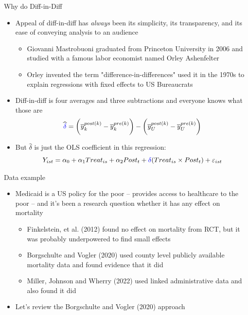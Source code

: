 \documentclass{beamer}
\begin{document}
\begin{frame}{Why do Diff-in-Diff}

\begin{itemize}
\item Appeal of diff-in-diff has \emph{always} been its simplicity, its transparency, and its ease of conveying analysis to an audience
	\begin{itemize}
	\item Giovanni Mastrobuoni graduated from Princeton University in 2006 and studied with a famous labor economist named Orley Ashenfelter
	\item Orley invented the term "difference-in-differences" used it in the 1970s to explain regressions with fixed effects to US Bureaucrats
	\end{itemize}
\item Diff-in-diff is four averages and three subtractions and everyone knows what those are
$$\widehat{\textcolor{blue}{\delta}} = \bigg ( \overline{y}_k^{post(k)} - \overline{y}_k^{pre(k)} \bigg ) - \bigg ( \overline{y}_U^{post(k)} - \overline{y}_U^{pre(k)} \bigg ) $$
\item But $\widehat{\delta}$ is just the OLS coefficient in this regression:
$$Y_{ist} = \alpha_0 + \alpha_1 Treat_{is} + \alpha_2 Post_{t} + \textcolor{blue}{\delta} (Treat_{is} \times Post_t) + \varepsilon_{ist} $$
\end{itemize}

\end{frame}


\begin{frame}{Data example}

\begin{itemize}
\item Medicaid is a US policy for the poor -- provides access to healthcare to the poor -- and it's been a research question whether it has any effect on mortality
	\begin{itemize}
	\item Finkelstein, et al. (2012) found no effect on mortality from RCT, but it was probably underpowered to find small effects
	\item Borgschulte and Vogler (2020) used county level publicly available mortality data and found evidence that it did
	\item Miller, Johnson and Wherry (2022) used linked administrative data and also found it did
	\end{itemize}
\item Let's review the Borgschulte and Vogler (2020) approach

\end{itemize}

\end{frame}
\end{document}
